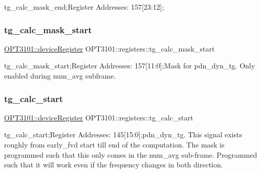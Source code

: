 tg\+\_\+calc\+\_\+mask\+\_\+end;Register Addresses\+: 157\mbox{[}23\+:12\mbox{]}; 

\mbox{\label{class_o_p_t3101_1_1registers_afff23a0f85b17bf4808705d0231a719f}} 
\subsubsection{\texorpdfstring{tg\+\_\+calc\+\_\+mask\+\_\+start}{tg\_calc\_mask\_start}}
{\footnotesize\ttfamily \mbox{\hyperlink{class_o_p_t3101_1_1device_register}{O\+P\+T3101\+::device\+Register}} O\+P\+T3101\+::registers\+::tg\+\_\+calc\+\_\+mask\+\_\+start}



tg\+\_\+calc\+\_\+mask\+\_\+start;Register Addresses\+: 157\mbox{[}11\+:0\mbox{]};Mask for pdn\+\_\+dyn\+\_\+tg. Only enabled during num\+\_\+avg subframe. 

\mbox{\label{class_o_p_t3101_1_1registers_ab1ac2d988d3463d49c708505b9d10e38}} 
\subsubsection{\texorpdfstring{tg\+\_\+calc\+\_\+start}{tg\_calc\_start}}
{\footnotesize\ttfamily \mbox{\hyperlink{class_o_p_t3101_1_1device_register}{O\+P\+T3101\+::device\+Register}} O\+P\+T3101\+::registers\+::tg\+\_\+calc\+\_\+start}



tg\+\_\+calc\+\_\+start;Register Addresses\+: 145\mbox{[}15\+:0\mbox{]};pdn\+\_\+dyn\+\_\+tg. This signal exists roughly from early\+\_\+fvd start till end of the computation. The mask is programmed such that this only comes in the num\+\_\+avg sub-\/frame. Programmed such that it will work even if the frequency changes in both direction. 

\mbox{\label{class_o_p_t3101_1_1registers_a61bb2d508902da5f6189058aaa7a21d5}} 
